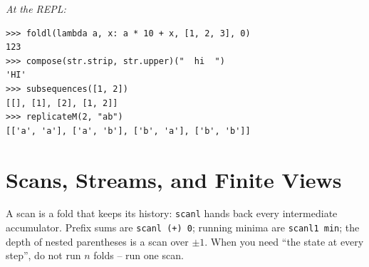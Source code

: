 \documentclass[11pt,letterpaper]{book}
\begin{document}
\noindent\textit{At the REPL:}
\begin{lstlisting}[style=spec]
>>> foldl(lambda a, x: a * 10 + x, [1, 2, 3], 0)
123
>>> compose(str.strip, str.upper)("  hi  ")
'HI'
>>> subsequences([1, 2])
[[], [1], [2], [1, 2]]
>>> replicateM(2, "ab")
[['a', 'a'], ['a', 'b'], ['b', 'a'], ['b', 'b']]
\end{lstlisting}
\chapter{Scans, Streams, and Finite Views}

A scan is a fold that keeps its history: \texttt{scanl} hands back every
intermediate accumulator. Prefix sums are \texttt{scanl (+) 0}; running
minima are \texttt{scanl1 min}; the depth of nested parentheses is a scan over
$\pm1$. When you need ``the state at every step'', do not run $n$ folds -- run
one scan.
\end{document}
